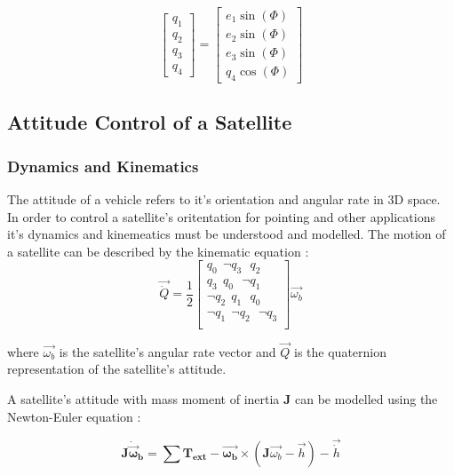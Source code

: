 \begin{equation}
    \begin{bmatrix}
        q_{1} \\ q_{2} \\ q_{3} \\ q_{4}
    \end{bmatrix}
    =
    \begin{bmatrix}
        e_{1}\sin(\Phi) \\ e_{2}\sin(\Phi) \\ e_{3}\sin(\Phi) \\ q_{4}\cos(\Phi)
    \end{bmatrix}
\end{equation}



\subsection{Attitude Control of a Satellite}
\subsubsection{Dynamics and Kinematics}
The attitude of a vehicle refers to it's orientation and angular rate in 3D space. In order to control a satellite's oritentation for pointing and other applications it's dynamics and kinemeatics must be understood and modelled. The motion of a satellite can be described by the kinematic equation \cite{sidiAttitudeDynamicsKinematics1997}:
\begin{equation}
    \vec{\dot{Q}}
=\frac{1}{2}
\begin{bmatrix}
q_{0} \ \ \neg q_{3} \ \ \ q_{2} \\ 
q_{3} \ \ q_{0} \ \ \ \neg q_{1} \\ 
\neg q_{2} \ \ q_{1} \ \ \ q_{0} \\ 
\neg q_{1} \ \ \neg q_{2} \ \ \ \neg q_{3} \\
\end{bmatrix} \vec{\omega_{b}}
\end{equation}

where $\vec{\omega_{b}}$ is the satellite's angular rate vector and $\vec{Q}$ is the quaternion representation of the satellite's attitude. 

A satellite's attitude with mass moment of inertia $\boldsymbol{J}$ can be modelled using the Newton-Euler equation \cite{sidiAttitudeDynamicsKinematics1997}: 

\begin{equation}
\mathbf{J}\mathbf{\dot{\vec{\omega}}_b} = \sum{\mathbf{T_{ext}}} -\mathbf{\vec{\omega_{b}}}\times(\mathbf{J}\vec{\omega_{b}}-\vec{h})-\vec{\dot{h}}
\end{equation}

